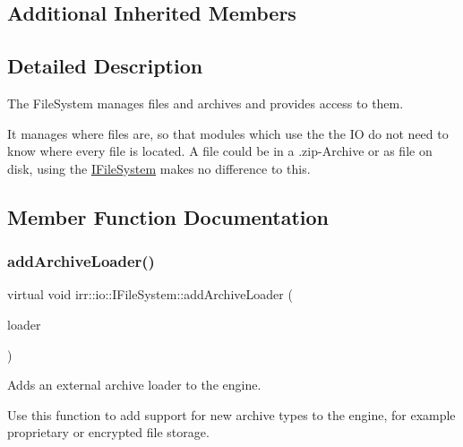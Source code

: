 \subsection*{Additional Inherited Members}


\subsection{Detailed Description}
The File\+System manages files and archives and provides access to them. 

It manages where files are, so that modules which use the the IO do not need to know where every file is located. A file could be in a .zip-\/\+Archive or as file on disk, using the \hyperlink{classirr_1_1io_1_1IFileSystem}{I\+File\+System} makes no difference to this. 

\subsection{Member Function Documentation}
\mbox{\label{classirr_1_1io_1_1IFileSystem_ad56456302b4697c49b461a909d9269b9}} 
\subsubsection{\texorpdfstring{add\+Archive\+Loader()}{addArchiveLoader()}\hspace{0.1cm}{\footnotesize\ttfamily [1/2]}}
{\footnotesize\ttfamily virtual void irr\+::io\+::\+I\+File\+System\+::add\+Archive\+Loader (\begin{DoxyParamCaption}\item[{\hyperlink{classirr_1_1io_1_1IArchiveLoader}{I\+Archive\+Loader} $\ast$}]{loader }\end{DoxyParamCaption})\hspace{0.3cm}{\ttfamily [pure virtual]}}



Adds an external archive loader to the engine. 

Use this function to add support for new archive types to the engine, for example proprietary or encrypted file storage. \mbox{\label{classirr_1_1io_1_1IFileSystem_ad56456302b4697c49b461a909d9269b9}} 
